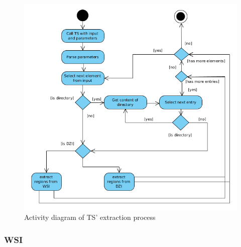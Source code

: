 \begin{figure}[H]
	
	\begin{center}
		\includegraphics[scale=0.45]{img/ts_run.png}
		\caption{Activity diagram of TS' extraction process}
		\label{fig5_extractionProcess}
	\end{center}
\end{figure}


\subsubsection{WSI}

